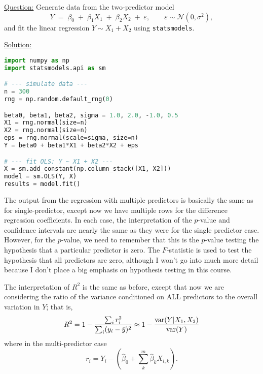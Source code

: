 \begin{example}
\noindent\underline{Question:} Generate data from the two-predictor model
\[
Y \;=\; \beta_0 \;+\; \beta_1 X_1 \;+\; \beta_2 X_2 \;+\; \varepsilon,\qquad \varepsilon\sim\mathcal N(0,\sigma^2),
\]
and fit the linear regression \(Y\sim X_1+X_2\) using \texttt{statsmodels}.

\medskip
\noindent\underline{Solution:}
\begin{lstlisting}[language=Python]
import numpy as np
import statsmodels.api as sm

# --- simulate data ---
n = 300
rng = np.random.default_rng(0)

beta0, beta1, beta2, sigma = 1.0, 2.0, -1.0, 0.5
X1 = rng.normal(size=n)
X2 = rng.normal(size=n)
eps = rng.normal(scale=sigma, size=n)
Y = beta0 + beta1*X1 + beta2*X2 + eps

# --- fit OLS: Y ~ X1 + X2 ---
X = sm.add_constant(np.column_stack([X1, X2]))
model = sm.OLS(Y, X)
results = model.fit()
\end{lstlisting}
\end{example}

The output from the regression with multiple predictors is basically the same as for single-predictor, except now we have multiple rows for the difference regression coefficients. In each case, the interpretation of the $p$-value and confidence intervals are nearly the same as they were for the single predictor case. However, for the $p$-value, we need to remember that this is the $p$-value testing the hypothesis that a particular predictor is zero. The $F$-statistic is used to test the hypothesis that all predictors are zero, although I won't go into much more detail because I don't place a big emphasis on hypothesis testing in this course. 

 The interpretation of $R^2$ is the same as before, except that now we are considering the ratio of the variance conditioned on ALL predictors to the overall variation in $Y$; that is, 
\begin{equation*}
R^2 = 1 - \frac{\sum_i r_i^2}{\sum_i (y_i - \bar{y})^2}    \approx 1 - \frac{{\rm var}(Y|X_1,X_2)}{{\rm var}(Y)}
\end{equation*} 
where in the multi-predictor case 
\begin{equation}
r_i = Y_i - \left(\hat{\beta}_0 + \sum_k^m \hat{\beta}_kX_{i,k}\right). 
\end{equation} 



